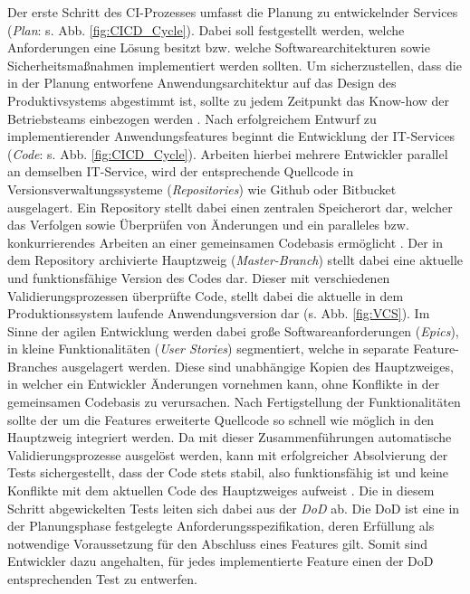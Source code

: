 Der erste Schritt des CI-Prozesses umfasst die Planung zu entwickelnder Services (\textit{Plan}: s. Abb. \ref*{fig:CICD_Cycle}). Dabei soll festgestellt werden, welche Anforderungen eine Lösung besitzt bzw. welche Softwarearchitekturen sowie Sicherheitsmaßnahmen implementiert werden sollten. Um sicherzustellen, dass die in der Planung entworfene Anwendungsarchitektur auf das Design des Produktivsystems abgestimmt ist, sollte zu jedem Zeitpunkt das Know-how der Betriebsteams einbezogen werden \cite[16]{Halstenberg.2020}. Nach erfolgreichem Entwurf zu implementierender Anwendungsfeatures beginnt die Entwicklung der IT-Services (\textit{Code}: s. Abb. \ref*{fig:CICD_Cycle}). Arbeiten hierbei mehrere Entwickler parallel an demselben IT-Service, wird der entsprechende Quellcode in Versionsverwaltungssysteme (\textit{Repositories}) wie Github oder Bitbucket ausgelagert. Ein Repository stellt dabei einen zentralen Speicherort dar, welcher das Verfolgen sowie Überprüfen von Änderungen und ein paralleles bzw. konkurrierendes Arbeiten an einer gemeinsamen Codebasis ermöglicht \cite[31]{Loeliger.2012}. Der in dem Repository archivierte Hauptzweig (\textit{Master-Branch}) stellt dabei eine aktuelle und funktionsfähige Version des Codes dar. Dieser mit verschiedenen Validierungsprozessen überprüfte Code, stellt dabei die aktuelle in dem Produktionssystem laufende Anwendungsversion dar (s. Abb. \ref*{fig:VCS}). Im Sinne der agilen Entwicklung werden dabei große Softwareanforderungen (\textit{Epics}), in kleine Funktionalitäten (\textit{User Stories}) segmentiert, welche in separate Feature-Branches ausgelagert werden. Diese sind unabhängige Kopien des Hauptzweiges, in welcher ein Entwickler Änderungen vornehmen kann, ohne Konflikte in der gemeinsamen Codebasis zu verursachen. Nach Fertigstellung der Funktionalitäten sollte der um die Features erweiterte Quellcode so schnell wie möglich in den Hauptzweig integriert werden. Da mit dieser Zusammenführungen automatische Validierungsprozesse ausgelöst werden, kann mit erfolgreicher Absolvierung der Tests sichergestellt, dass der Code stets stabil, also funktionsfähig ist und keine Konflikte mit dem aktuellen Code des Hauptzweiges aufweist \cite[169]{Loeliger.2012}. Die in diesem Schritt abgewickelten Tests leiten sich dabei aus der \textit{\ac{DoD}} ab. Die DoD ist eine in der Planungsphase festgelegte Anforderungsspezifikation, deren Erfüllung als notwendige Voraussetzung für den Abschluss eines Features gilt. Somit sind Entwickler dazu angehalten, für jedes implementierte Feature einen der DoD entsprechenden Test zu entwerfen.
